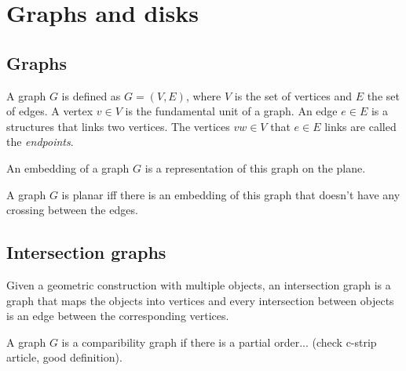 \chapter{Graphs and disks}


\section{Graphs}

A graph $G$ is defined as $G = (V,E)$, where $V$ is the set of vertices and $E$ the set of edges. A vertex $v \in V$ is the fundamental unit of a graph. An edge $e \in E$ is a structures that links two vertices. The vertices $vw \in V$ that $e \in E$ links are called the \textit{endpoints}.

\begin{definition}
  An embedding of a graph $G$ is a representation of this graph on the plane.
\end{definition}

\begin{definition}
  A graph $G$ is planar iff there is an embedding of this graph that doesn't have any crossing between the edges.
\end{definition}


\section{Intersection graphs}

%

Given a geometric construction with multiple objects, an intersection graph is a graph that maps the objects into vertices and every intersection between objects is an edge between the corresponding vertices.

\begin{definition}
  A graph $G$ is a comparibility graph if there is a partial order... (check c-strip article, good definition).
\end{definition}

